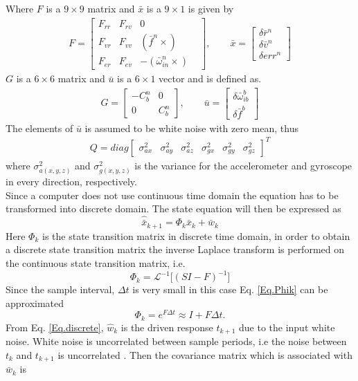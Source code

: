 Where $F$ is a $9\times 9$ matrix and $\bar{x}$ is a $9 \times 1$ is given by
\begin{align}
F=
\begin{bmatrix}
F_{rr} & F_{rv} & 0 &\\
F_{vr} & F_{vv} & (\bar{f}^n \times)\\
F_{er} & F_{ev} & -(\bar{\omega}_{in}^n\times)
\end{bmatrix},
\qquad
\bar{x}=
\begin{bmatrix}
\delta\bar{r}^n \\
\delta\bar{v}^n\\
\delta err^n
\end{bmatrix}
\end{align}
$G$ is a $6\times6$ matrix and $\bar{u}$ is a $6 \times 1$ vector and is defined as.
\begin{align}
G=
\begin{bmatrix}
-C_b^n & 0 \\
0 & C_b^n
\end{bmatrix},
\qquad
\bar{u}=
\begin{bmatrix}
\delta \bar{\omega}_{ib}^b \\
\delta \bar{f}^b 
\end{bmatrix}
\end{align}
The elements of $\bar{u}$ is assumed to be white noise with zero mean, thus
\begin{align}
Q=diag
\begin{bmatrix}
\sigma^2_{ax} & \sigma^2_{ay} & \sigma^2_{az} & \sigma^2_{gx} & \sigma^2_{gy} & \sigma^2_{gz}
\end{bmatrix}^T
\label{Eq.Q}
\end{align}
where $\sigma^2_{a(x,y,z)}$ and $\sigma^2_{g(x,y,z)}$ is the variance for the accelerometer and gyroscope in every direction, respectively.\\

Since a computer does not use continuous time domain the equation has to be transformed into discrete domain. The state equation will then be expressed as
\begin{equation}
\hat{\bar{x}}_{k+1} = \Phi_k \bar{x}_k +  \bar{w}_k	
\label{Eq.discrete}
\end{equation}
Here $\Phi_k$ is the state transition matrix in discrete time domain, in order to  obtain a discrete state transition matrix the inverse Laplace transform is performed on the continuous state transition matrix, i.e.
\begin{equation}
\Phi_k = \mathcal{L}^{-1}\big[(SI-F)^{-1}\big]
\label{Eq.Phik}
\end{equation}
Since the sample interval, $\Delta t$ is very small in this case Eq. \eqref{Eq.Phik} can be approximated 
\begin{equation}
\Phi_k = e^{F\Delta t} \approx I + F \Delta t 
\label{Eq.Final_Phik}.
\end{equation}
From Eq. \eqref{Eq.discrete}, $\hat{w}_k$ is the driven response $t_{k+1}$ due to the input white noise. White noise is uncorrelated between sample periods, i.e the noise between $t_k$ and $t_{k+1}$ is uncorrelated \cite{signal_process}. Then the covariance matrix which is associated with $\bar{w}_k$ is \cite{signal_process}

